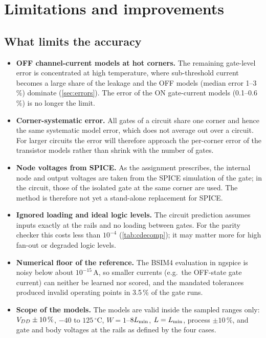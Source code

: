 \section{Limitations and improvements}\label{sec:limits}

\subsection{What limits the accuracy}
\begin{itemize}
  \item \textbf{OFF channel-current models at hot corners.} The remaining gate-level error is concentrated at high temperature, where sub-threshold
        current becomes a large share of the leakage and the OFF models (median error 1--3\,\%) dominate (\cref{sec:errors}). The error of the ON
        gate-current models (0.1--0.6\,\%) is no longer the limit.
  \item \textbf{Corner-systematic error.} All gates of a circuit share one corner and hence the same systematic model error, which does not
        average out over a circuit. For larger circuits the error will therefore approach the per-corner error of the transistor models rather than
        shrink with the number of gates.
  \item \textbf{Node voltages from SPICE.} As the assignment prescribes, the internal node and output voltages are taken from the SPICE simulation of
        the gate; in the circuit, those of the isolated gate at the same corner are used. The method is therefore not yet a stand-alone replacement for SPICE.
  \item \textbf{Ignored loading and ideal logic levels.} The circuit prediction assumes inputs exactly at the rails and no loading between gates. For the
        parity checker this costs less than $10^{-4}$ (\cref{tab:cdecomp}); it may matter more for high fan-out or degraded logic levels.
  \item \textbf{Numerical floor of the reference.} The BSIM4 evaluation in ngspice is noisy below about $10^{-15}$\,A, so smaller currents (e.g.\ the
        OFF-state gate current) can neither be learned nor scored, and the mandated tolerances produced invalid operating points in 3.5\,\% of the gate runs.
  \item \textbf{Scope of the models.} The models are valid inside the sampled ranges only: $V_{DD}\pm10\,\%$, $-40$ to $125\,^\circ$C, $W=1$--$8L_{\min}$,
        $L=L_{\min}$, process $\pm10\,\%$, and gate and body voltages at the rails as defined by the four cases.

\end{itemize}
